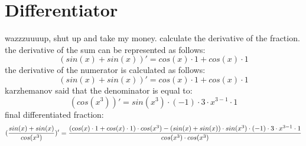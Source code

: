 \documentclass{article}
\begin{document}
\section{Differentiator}
wazzzuuuup, shut up and take my money.
calculate the derivative of the fraction.
the derivative of the sum can be represented as follows:$$ ({ { sin  {(  x  )}  }  +  { sin  {(  x  )}  } })' = { {  { cos  {(  x  )}  }  \cdot  {  1  }  }  +  {  { cos  {(  x  )}  }  \cdot  {  1  }  } } $$
the derivative of the numerator is calculated as follows: $$ ({ { sin  {(  x  )}  }  +  { sin  {(  x  )}  } })' = { {  { cos  {(  x  )}  }  \cdot  {  1  }  }  +  {  { cos  {(  x  )}  }  \cdot  {  1  }  } } $$
karzhemanov said that the denominator is equal to: $$ ({cos  {(  {  x  }  ^  {  3  }  )} })' = { {  { sin  {(  {  x  }  ^  {  3  }  )}  }  \cdot  {  (  -1  )  }  }  \cdot  {  {  {  3  }  \cdot  {  {  x  }  ^  {  {  3  }  -  {  1  }  }  }  }  \cdot  {  1  }  } } $$
final differentiated fraction: $$ ({ {  { sin  {(  x  )}  }  +  { sin  {(  x  )}  }  }  \over  { cos  {(  {  x  }  ^  {  3  }  )}  } })' = { {  {  {  (  {  { cos  {(  x  )}  }  \cdot  {  1  }  }  +  {  { cos  {(  x  )}  }  \cdot  {  1  }  }  )  }  \cdot  { cos  {(  {  x  }  ^  {  3  }  )}  }  }  -  {  {  (  { sin  {(  x  )}  }  +  { sin  {(  x  )}  }  )  }  \cdot  {  {  { sin  {(  {  x  }  ^  {  3  }  )}  }  \cdot  {  (  -1  )  }  }  \cdot  {  {  {  3  }  \cdot  {  {  x  }  ^  {  {  3  }  -  {  1  }  }  }  }  \cdot  {  1  }  }  }  }  }  \over  {  { cos  {(  {  x  }  ^  {  3  }  )}  }  \cdot  { cos  {(  {  x  }  ^  {  3  }  )}  }  } } $$
\end{document}
